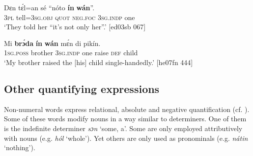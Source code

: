 \ea%
    \label{ex:key:257}
    \gll Dɛn    tɛ́l=an    sé    “nóto  \textbf{ín}    \textbf{wán}”.\\
\textsc{3pl}    tell=\textsc{3sg.obj}  \textsc{quot}    \textsc{neg}.\textsc{foc}  \textsc{3sg.indp}  one\\

\glt ‘They told her “it’s not only her”.’ [ed03sb 067]
\z


\ea%
    \label{ex:key:258}
    \gll Mi    \textbf{brɔ́da}  \textbf{ín}    \textbf{wán}    mɛ́n    di  pikín. \\
\textsc{1sg.poss}  brother  \textsc{3sg.indp}  one    raise  \textsc{def}  child\\

\glt ‘My brother raised the [his] child single-handedly.’ [he07fn 444]
\z

\subsection{Other quantifying expressions}

Non-numeral words express relational, absolute and negative quantification (cf. ). Some of these words modify nouns in a way similar to determiners. One of them is the indefinite determiner \textit{sɔn} ‘some, a’. Some are only employed attributively with nouns (e.g. \textit{hól} ‘whole’). Yet others are only used as pronominals (e.g. \textit{nátin} ‘nothing’).

